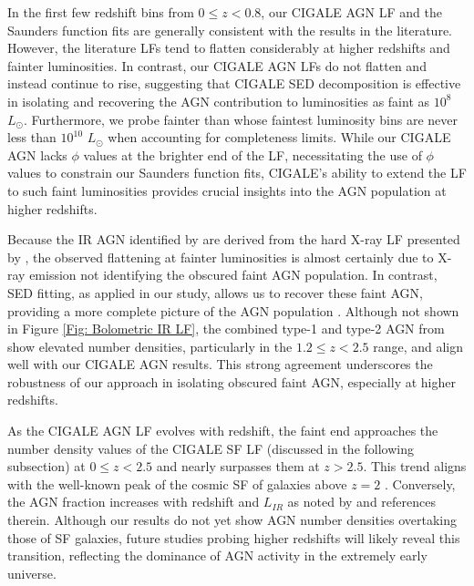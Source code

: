 In the first few redshift bins from $0 \leq z < 0.8$, our CIGALE AGN LF and the Saunders function fits are generally consistent with the results in the literature. However, the literature LFs tend to flatten considerably at higher redshifts and fainter luminosities. In contrast, our CIGALE AGN LFs do not flatten and instead continue to rise, suggesting that CIGALE SED decomposition is effective in isolating and recovering the AGN contribution to luminosities as faint as $10^8$ $L_{\odot}$. Furthermore, we probe fainter than \cite{thorne_deep_2022} whose faintest luminosity bins are never less than $10^{10}$ $L_{\odot}$ when accounting for completeness limits. While our CIGALE AGN lacks $\phi$ values at the brighter end of the LF, necessitating the use of \cite{thorne_deep_2022} $\phi$ values to constrain our Saunders function fits, CIGALE's ability to extend the LF to such faint luminosities provides crucial insights into the AGN population at higher redshifts.

Because the IR AGN identified by \cite{symeonidis_agn_2021} are derived from the hard X-ray LF presented by \cite{aird_evolution_2015}, the observed flattening at fainter luminosities is almost certainly due to X-ray emission not identifying the obscured faint AGN population. In contrast, SED fitting, as applied in our study, allows us to recover these faint AGN, providing a more complete picture of the AGN population \citep{gruppioni_modelling_2011, brown_infrared_2019, thorne_deep_2022}. Although not shown in Figure \ref{Fig: Bolometric IR LF}, the combined type-1 and type-2 AGN from \cite{symeonidis_agn_2021} show elevated number densities, particularly in the $1.2 \leq z < 2.5$ range, and align well with our CIGALE AGN results. This strong agreement underscores the robustness of our approach in isolating obscured faint AGN, especially at higher redshifts.

As the CIGALE AGN LF evolves with redshift, the faint end approaches the number density values of the CIGALE SF LF (discussed in the following subsection) at $0 \leq z < 2.5$ and nearly surpasses them at $z > 2.5$. This trend aligns with the well-known peak of the cosmic SF of galaxies above $z=2$ \citep{madau_cosmic_2014}. Conversely, the AGN fraction increases with redshift and $L_{IR}$ as noted by \cite{symeonidis_agn_2021, thorne_deep_2022} and references therein. Although our results do not yet show AGN number densities overtaking those of SF galaxies, future studies probing higher redshifts will likely reveal this transition, reflecting the dominance of AGN activity in the extremely early universe.


